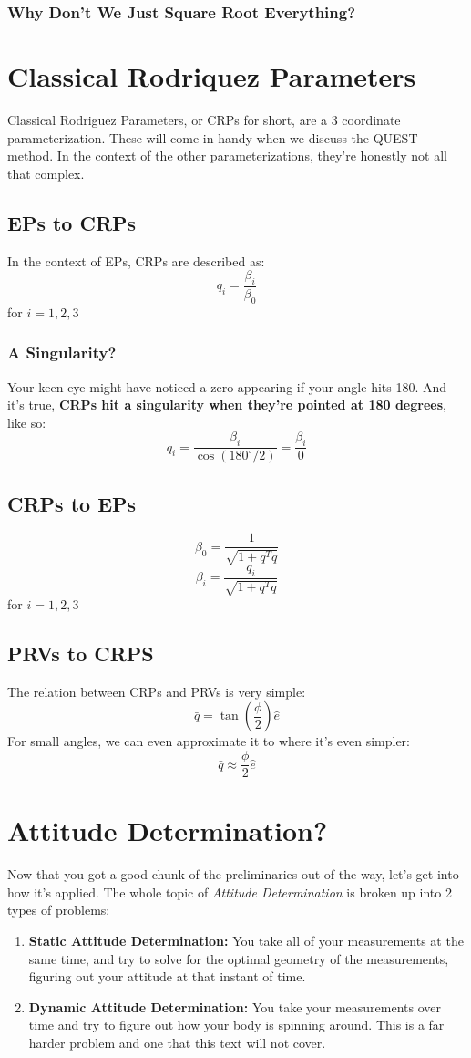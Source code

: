\documentclass[a4paper,14pt]{extreport}
\begin{document}
\subsection{Why Don't We Just Square Root Everything?}
\chapter{Classical Rodriquez Parameters}
Classical Rodriguez Parameters, or CRPs for short, are a 3 coordinate parameterization. These will come in handy when we discuss the QUEST method. In the context of the other parameterizations, they're honestly not all that complex.
\section{EPs to CRPs}
In the context of EPs, CRPs are described as:
\[
q_i = \dfrac{\beta_i}{\beta_0}
\]
for \(i=1,2,3\)
\subsection{A Singularity?}
Your keen eye might have noticed a zero appearing if your angle hits 180. And it's true, \textbf{CRPs hit a singularity when they're pointed at 180 degrees}, like so:
\[
q_i = \dfrac{\beta_i}{\cos(180^{\circ}/2)} = \dfrac{\beta_i}{0}
\]
\section{CRPs to EPs}
\[
\beta_0 = \dfrac{1}{\sqrt{1+q^Tq}}
\]
\[
\beta_i = \dfrac{q_i}{\sqrt{1+q^Tq}}
\]
for \(i=1,2,3\)
\section{PRVs to CRPS}
The relation between CRPs and PRVs is very simple:
\[
\bar{q} = \tan{(\dfrac{\phi}{2})}\hat{e}
\]
For small angles, we can even approximate it to where it's even simpler:
\[
\bar{q} \approx \dfrac{\phi}{2}\hat{e}
\]
\chapter{Attitude Determination?}
Now that you got a good chunk of the preliminaries out of the way, let's get into how it's applied. The whole topic of \emph{Attitude Determination} is broken up into 2 types of problems:
\begin{enumerate}
\item{
\textbf{Static Attitude Determination:} You take all of your measurements at the same time, and try to solve for the optimal geometry of the measurements, figuring out your attitude at that instant of time.
}
\item{\textbf{Dynamic Attitude Determination:} You take your measurements over time and try to figure out how your body is spinning around. This is a far harder problem and one that this text will not cover.
}
\end{enumerate}
\end{document}
